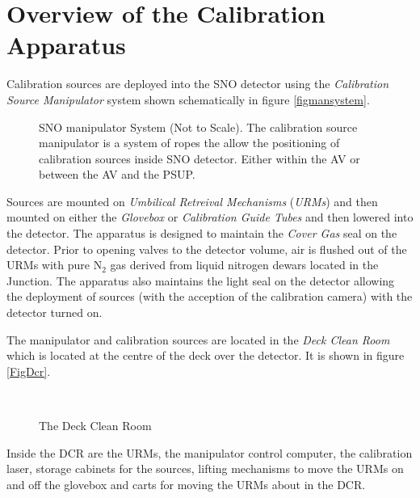 
\section{Overview of the Calibration Apparatus}

  Calibration sources are deployed into the SNO detector using
the {\em Calibration Source Manipulator} system shown schematically
in figure \ref{figmansystem}. 
\begin{figure}[htbp]
\begin{center}
\leavevmode
\epsfxsize=5.0in
\caption[Schmatic layout of the SNO manipulator]{
  SNO manipulator System (Not to Scale).  The calibration
  source manipulator is a system of ropes the allow the positioning
  of calibration sources inside SNO detector.  Either within the AV
  or between the AV and the PSUP.
  }
\end{center}
\end{figure}
  Sources
are mounted on {\em Umbilical Retreival Mechanisms} ({\em URMs})
and then mounted on either the {\em Glovebox} or {\em Calibration
Guide Tubes} and then lowered into the detector.  The apparatus is
designed to maintain the {\em Cover Gas} seal on the detector.  Prior
to opening valves to the detector volume, air is flushed out of the
URMs with pure N$_2$ gas derived from liquid nitrogen dewars located
in the Junction.  The apparatus also maintains the light seal on the
detector allowing the deployment of sources (with the acception of
the calibration camera) with the detector turned on.


  The manipulator and calibration sources are located in the 
{\em Deck Clean Room} which is located at the centre of the deck
over the detector.  It is shown in figure \ref{FigDcr}. 
\begin{figure}
\begin{center}
\leavevmode
\epsfxsize=7in
~\\
\caption[Deck Clean Room]
        {The Deck Clean Room
        }
\end{center}
\end{figure} 
Inside the DCR are the URMs, the manipulator control computer,
the calibration laser, storage cabinets for the sources, lifting
mechanisms to move the URMs on and off the glovebox and carts for
moving the URMs about in the DCR. 

